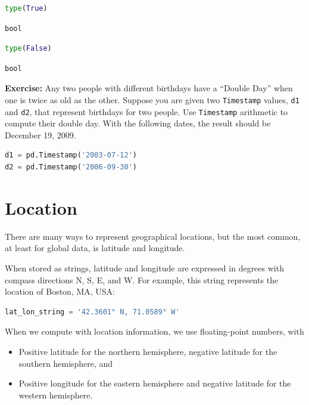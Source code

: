 \begin{lstlisting}[language=Python,style=source]
type(True)
\end{lstlisting}

\begin{lstlisting}[style=output]
bool
\end{lstlisting}

\begin{lstlisting}[language=Python,style=source]
type(False)
\end{lstlisting}

\begin{lstlisting}[style=output]
bool
\end{lstlisting}

\textbf{Exercise:} Any two people with different birthdays have a
``Double Day'' when one is twice as old as the other. Suppose you are
given two \passthrough{\lstinline!Timestamp!} values,
\passthrough{\lstinline!d1!} and \passthrough{\lstinline!d2!}, that
represent birthdays for two people. Use
\passthrough{\lstinline!Timestamp!} arithmetic to compute their double
day. With the following dates, the result should be December 19, 2009.

\begin{lstlisting}[language=Python,style=source]
d1 = pd.Timestamp('2003-07-12')
d2 = pd.Timestamp('2006-09-30')
\end{lstlisting}

\hypertarget{location}{%
\section{Location}\label{location}}

There are many ways to represent geographical locations, but the most
common, at least for global data, is latitude and longitude.

When stored as strings, latitude and longitude are expressed in degrees
with compass directions N, S, E, and W. For example, this string
represents the location of Boston, MA, USA:

\begin{lstlisting}[language=Python,style=source]
lat_lon_string = '42.3601° N, 71.0589° W'
\end{lstlisting}

When we compute with location information, we use floating-point
numbers, with

\begin{itemize}
\item
  Positive latitude for the northern hemisphere, negative latitude for
  the southern hemisphere, and
\item
  Positive longitude for the eastern hemisphere and negative latitude
  for the western hemisphere.
\end{itemize}

